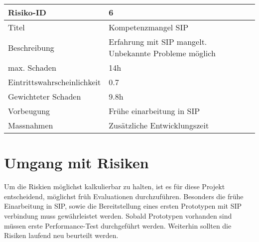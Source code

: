 	
\noindent
\begin{tabular}{|p{} | p{} |}
	\hline	
	Risiko-ID & 6 \\
	\hline
	Titel & Kompetenzmangel SIP \\
	Beschreibung & Erfahrung mit SIP mangelt. Unbekannte Probleme möglich \\
	max. Schaden	& 14h \\
	Eintrittswahrscheinlichkeit & 0.7 \\
	Gewichteter Schaden	& 9.8h \\
	Vorbeugung	& Frühe einarbeitung in SIP \\
	Massnahmen	& Zusätzliche Entwicklungszeit \\
	\hline
\end{tabular}
\hspace{0.5cm}
\newline


\section{Umgang mit Risiken}
Um die Riskien möglichst kalkulierbar zu halten, ist es für diese Projekt entscheidend, möglichst früh
Evaluationen durchzuführen. Besonders die frühe Einarbeitung in SIP, sowie die Bereitstellung eines ersten
Prototypen mit SIP verbindung muss gewährleistet werden. Sobald Prototypen vorhanden sind müssen erste
Performance-Test durchgeführt werden. Weiterhin sollten die Risiken laufend neu beurteilt werden.
